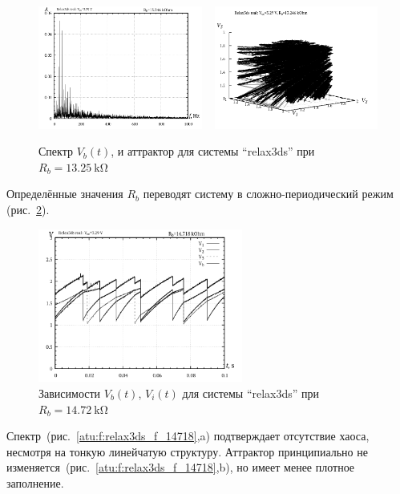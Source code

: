 \begin{figure}[htb!]
  \centerline{
    \includegraphics[width=0.48\textwidth]{p/relax3ds_f_013246.png}
    ~
    \includegraphics[width=0.48\textwidth]{p/relax3ds_v1v2v3_013246.png}
  }
  \caption{Спектр $V_b(t)$, и аттрактор для системы ``relax3ds'' при $R_b=\SI{13.25}{\kilo\ohm}$ }
  \label{atu:f:relax3ds_f_13246}
\end{figure}


Определённые значения $R_b$ переводят систему в сложно-периодический режим
(рис.~\ref{atu:f:relax3ds_t_14718}).

\begin{figure}[htb!]
  \centerline{\includegraphics[width=0.6\textwidth]{p/relax3ds_t_014718.png} }
  \caption{Зависимости $V_b(t)$, $V_i(t)$ для системы ``relax3ds'' при $R_b=\SI{14.72}{\kilo\ohm}$ }
  \label{atu:f:relax3ds_t_14718}
\end{figure}

Спектр~(рис.~\ref{atu:f:relax3ds_f_14718},a)
подтверждает отсутствие хаоса,
несмотря на тонкую линейчатую структуру.
Аттрактор принципиально не изменяется~(рис.~\ref{atu:f:relax3ds_f_14718},b),
но имеет менее плотное заполнение.


